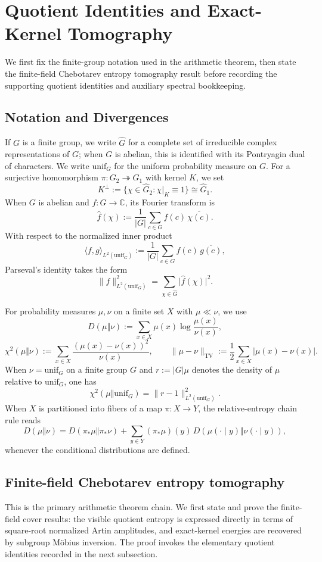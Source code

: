 \documentclass[12pt,a4paper]{article}
\theoremstyle{plain}
\theoremstyle{definition}
\numberwithin{equation}{section}
\newcommand{\CC}{\mathbb{C}}
\newcommand{\abs}[1]{\lvert #1\rvert}
\begin{document}
\section{Quotient Identities and Exact-Kernel Tomography}\label{sec:entropy-chain}
We first fix the finite-group notation used in the arithmetic theorem, then state the finite-field Chebotarev entropy tomography result before recording the supporting quotient identities and auxiliary spectral bookkeeping.

\subsection{Notation and Divergences}
If \(G\) is a finite group, we write \(\widehat G\) for a complete set of irreducible complex representations of \(G\); when \(G\) is abelian, this is identified with its Pontryagin dual of characters. We write \(\mathrm{unif}_G\) for the uniform probability measure on \(G\). For a surjective homomorphism \(\pi:G_2\twoheadrightarrow G_1\) with kernel \(K\), we set
\[
K^\perp:=\{\chi\in\widehat G_2:\chi|_K\equiv 1\}\cong \widehat G_1.
\]
When \(G\) is abelian and \(f:G\to \CC\), its Fourier transform is
\[
\widehat f(\chi):=\frac{1}{|G|}\sum_{c\in G} f(c)\,\overline{\chi(c)}.
\]
With respect to the normalized inner product
\[
\langle f,g\rangle_{L^2(\mathrm{unif}_G)}:=\frac{1}{|G|}\sum_{c\in G}f(c)\,\overline{g(c)},
\]
Parseval's identity takes the form
\[
\|f\|_{L^2(\mathrm{unif}_G)}^2=\sum_{\chi\in \widehat G}\abs{\widehat f(\chi)}^2.
\]

For probability measures \(\mu,\nu\) on a finite set \(X\) with \(\mu\ll\nu\), we use
\[
D(\mu\Vert \nu):=\sum_{x\in X}\mu(x)\log\frac{\mu(x)}{\nu(x)},
\]
\[
\chi^2(\mu\Vert \nu):=\sum_{x\in X}\frac{(\mu(x)-\nu(x))^2}{\nu(x)},
\qquad
\|\mu-\nu\|_{\mathrm{TV}}:=\frac12\sum_{x\in X}\abs{\mu(x)-\nu(x)}.
\]
When \(\nu=\mathrm{unif}_G\) on a finite group \(G\) and \(r:=|G|\mu\) denotes the density of \(\mu\) relative to \(\mathrm{unif}_G\), one has
\[
\chi^2(\mu\Vert \mathrm{unif}_G)=\|r-1\|_{L^2(\mathrm{unif}_G)}^2.
\]
When \(X\) is partitioned into fibers of a map \(\pi:X\to Y\), the relative-entropy chain rule reads
\[
D(\mu\Vert \nu)=D(\pi_\ast\mu\Vert \pi_\ast\nu)+\sum_{y\in Y}(\pi_\ast\mu)(y)\,D(\mu(\cdot\mid y)\Vert \nu(\cdot\mid y)),
\]
whenever the conditional distributions are defined.


\subsection{Finite-field Chebotarev entropy tomography}\label{subsec:finite-field-entropy-tomography}
This is the primary arithmetic theorem chain. We first state and prove the finite-field cover results: the visible quotient entropy is expressed directly in terms of square-root normalized Artin amplitudes, and exact-kernel energies are recovered by subgroup M\"obius inversion. The proof invokes the elementary quotient identities recorded in the next subsection.
\end{document}
